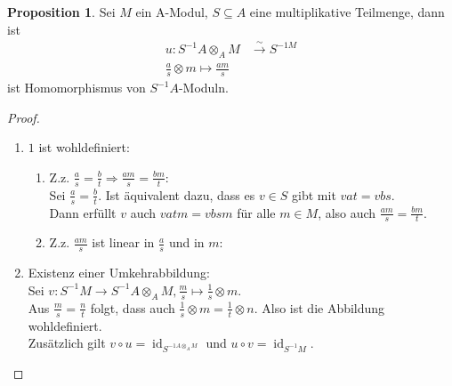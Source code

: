 \documentclass[10pt,a4paper]{article}
\newcommand{\isomfunc}{\ensuremath{\xrightarrow{\sim}}}
\newcommand{\id}{\operatorname{id}}
\newcounter{thm}[section]
\theoremstyle{definition}
\newtheorem{prop}[thm]{Proposition}
\theoremstyle{plain}
\theoremstyle{remark}
\begin{document}
\begin{prop}
	Sei $M$ ein A-Modul, $S\subseteq A$ eine multiplikative Teilmenge, dann ist
	\begin{align*}
	u:S^{-1}A\otimes_A M&\isomfunc S^{-1 M}\\
	\frac{a}{s}\otimes m\mapsto \frac{am}{s}
	\end{align*}
	ist Homomorphismus von $S^{-1}A$-Moduln.
\end{prop}
\begin{proof}
	\begin{enumerate}
		\item $1$ ist wohldefiniert:
		\begin{enumerate}
			\item Z.z. $\frac{a}{s}=\frac{b}{t}\Rightarrow \frac{am}{s}=\frac{bm}{t}$:\\
			Sei $\frac{a}{s}=\frac{b}{t}$. Ist äquivalent dazu, dass es $v\in S$ gibt mit $vat=vbs$.\\
			Dann erfüllt $v$ auch $vatm=vbsm$ für alle $m\in M$, also auch $\frac{am}{s}=\frac{bm}{t}$.
			\item Z.z. $\frac{am}{s}$ ist linear in $\frac{a}{s}$ und in $m$:
		\end{enumerate}
		\item Existenz einer Umkehrabbildung:\\
		Sei $v:S^{-1}M\rightarrow S^{-1}A\otimes_A M, \frac{m}{s}\mapsto\frac{1}{s}\otimes m$.\\
		Aus $\frac{m}{s}=\frac{n}{t}$ folgt, dass auch $\frac{1}{s}\otimes m=\frac{1}{t}\otimes n$. Also ist die Abbildung wohldefiniert.\\
		Zusätzlich gilt $v\circ u=\id_{S^{-1A\otimes_A M}}$ und $u\circ v=\id_{S^{-1}M}$.
	\end{enumerate}
\end{proof}
\end{document}
